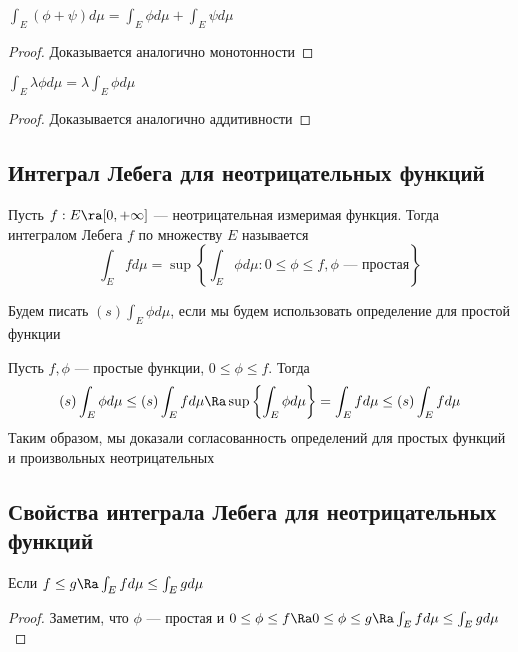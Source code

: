 \begin{proposition}[Аддитивность]
    \(\int_E (\phi + \psi) d \mu = \int_E \phi d \mu + \int_E \psi d \mu\)
\end{proposition}
\begin{proof}
    Доказывается аналогично монотонности
\end{proof}

\begin{proposition}[Однородность]
    \(\int_E \lambda \phi d \mu = \lambda \int_E \phi d  \mu\)
\end{proposition}
\begin{proof}
    Доказывается аналогично аддитивности
\end{proof}

\subsection{Интеграл Лебега для неотрицательных функций}

\begin{definition}
    Пусть \(f: E \ra [0, + \infty]\) --- неотрицательная измеримая функция. Тогда интегралом Лебега \(f\) по множеству \(E\) называется
    \[\int_E f d \mu = \sup\left\{\int_E \phi d \mu : 0 \le \phi \le f, \phi\text{ --- простая}\right\}\]
\end{definition}

Будем писать \((s)\int_E \phi d\mu\), если мы будем использовать определение для простой функции

\begin{note}
    Пусть \(f, \phi\) --- простые функции, \(0 \le \phi \le f\). Тогда 
    \[(s)\int_E \phi d\mu \le (s)\int_E fd\mu \Ra \sup\left\{\int_E \phi d \mu\right\} = \int_E f d\mu \le (s)\int_E fd\mu\]
    Таким образом, мы доказали согласованность определений для простых функций и произвольных неотрицательных
\end{note}

\subsection{Свойства интеграла Лебега для неотрицательных функций}
\begin{proposition}[Монотонность]
    Если \(f \le g \Ra \int_{E} f d \mu \le \int_{E} g d\mu\)
\end{proposition}
\begin{proof}
    Заметим, что \(\phi\) --- простая и \(0 \le \phi \le f \Ra 0 \le \phi \le g \Ra \int_{E} f d \mu \le \int_{E} g d\mu\)
\end{proof}


